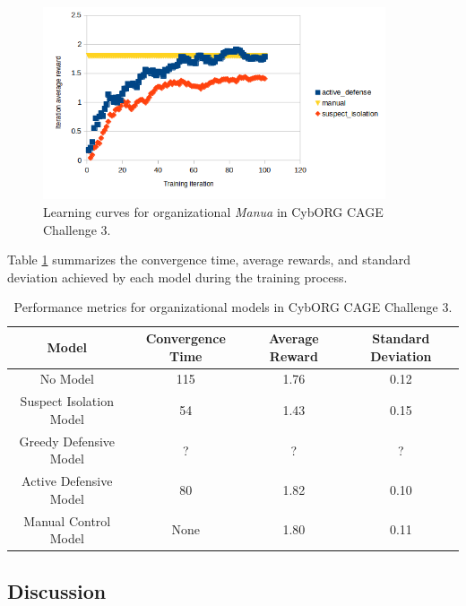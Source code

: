 \documentclass[conference]{IEEEtran}
\begin{document}
\begin{figure}[ht]
    \centering
    \includegraphics[width=0.9\textwidth]{figures/learning_curves.png}
    \caption{Learning curves for organizational \textit{Manua} in CybORG CAGE Challenge 3.}
    \label{fig:learning_curves}
\end{figure}

Table \ref{tab:results} summarizes the convergence time, average rewards, and standard deviation achieved by each model during the training process.

\begin{table}[ht]
    \centering
    \scriptsize
    \setlength{\tabcolsep}{3pt}
    \begin{tabular}{|c|c|c|c|}
        \hline
        Model                   & Convergence Time & Average Reward & Standard Deviation \\
        \hline
        No Model                & 115                          & 1.76           & 0.12               \\
        Suspect Isolation Model & 54                           & 1.43           & 0.15               \\
        Greedy Defensive Model  & ?                            & ?              & ?                  \\
        Active Defensive Model  & 80                           & 1.82           & 0.10               \\
        Manual Control Model    & None                         & 1.80           & 0.11               \\
        \hline
    \end{tabular}
    \caption{Performance metrics for organizational models in CybORG CAGE Challenge 3.}
    \label{tab:results}
\end{table}


\subsection{Discussion}
\end{document}
